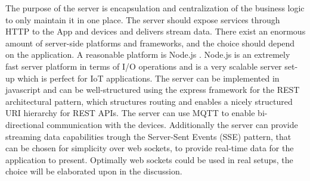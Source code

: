 The purpose of the server is encapsulation and centralization of the business logic to only maintain it in one place. The server should expose services through HTTP to the App and devices and delivers stream data. There exist an enormous amount of server-side platforms and frameworks, and the choice should depend on the application. A reasonable platform is Node.js \cite{node}. Node.js is an extremely fast server platform in terms of I/O operations and is a very scalable server set-up which is perfect for IoT applications. The server can be implemented in javascript and can be well-structured using the express framework \cite{express} for the REST architectural pattern, which structures routing and enables a nicely structured URI hierarchy for REST APIs. The server can use MQTT to enable bi-directional communication with the devices. Additionally the server can provide streaming data capabilities trough the Server-Sent Events (SSE) pattern, that can be chosen for simplicity over web sockets, to provide real-time data for the application to present. Optimally web sockets could be used in real setups, the choice will be elaborated upon in the discussion.